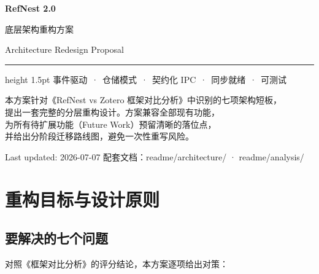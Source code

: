 \documentclass[12pt, a4paper]{article}
\begin{document}
\begin{titlepage}
  \centering
  \vspace*{2.5cm}
  {\Huge\bfseries\color{tsinghuapurple} RefNest 2.0}\par
  \vspace{0.6em}
  {\Large\color{sectionblue} 底层架构重构方案}\par
  \vspace{0.4em}
  {\large Architecture Redesign Proposal}\par
  \vspace{2em}
  \hrule height 1.5pt \relax
  \vspace{2em}
  {\normalsize 事件驱动 \,·\, 仓储模式 \,·\, 契约化 IPC \,·\, 同步就绪 \,·\, 可测试}\par
  \vspace{3cm}
  {\small
  本方案针对《RefNest vs Zotero 框架对比分析》中识别的七项架构短板，\\
  提出一套完整的分层重构设计。方案兼容全部现有功能，\\
  为所有待扩展功能（Future Work）预留清晰的落位点，\\
  并给出分阶段迁移路线图，避免一次性重写风险。
  }\par
  \vfill
  {\small\color{gray} Last updated: 2026-07-07 \quad 配套文档：readme/architecture/ · readme/analysis/}
\end{titlepage}

\tableofcontents
\newpage

\section{重构目标与设计原则}

\subsection{要解决的七个问题}

对照《框架对比分析》的评分结论，本方案逐项给出对策：
\end{document}
